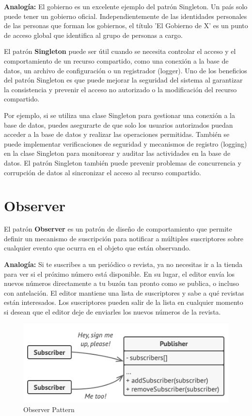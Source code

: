 \textbf{Analogía: }El gobierno es un excelente ejemplo del patrón Singleton. Un país solo puede tener un gobierno oficial. Independientemente de las identidades personales de las personas que forman los gobiernos, el título 'El Gobierno de X' es un punto de acceso global que identifica al grupo de personas a cargo.

El patrón \textbf{Singleton} puede ser útil cuando se necesita controlar el acceso y el comportamiento de un recurso compartido, como una conexión a la base de datos, un archivo de configuración o un registrador (logger). Uno de los beneficios del patrón Singleton es que puede mejorar la seguridad del sistema al garantizar la consistencia y prevenir el acceso no autorizado o la modificación del recurso compartido. 

Por ejemplo, si se utiliza una clase Singleton para gestionar una conexión a la base de datos, puedes asegurarte de que solo los usuarios autorizados puedan acceder a la base de datos y realizar las operaciones permitidas. También se puede implementar verificaciones de seguridad y mecanismos de registro (logging) en la clase Singleton para monitorear y auditar las actividades en la base de datos. El patrón Singleton también puede prevenir problemas de concurrencia y corrupción de datos al sincronizar el acceso al recurso compartido.


\section{Observer}

El patrón \textbf{Observer} es un patrón de diseño de comportamiento que permite definir un mecanismo de suscripción para notificar a múltiples suscriptores sobre cualquier evento que ocurra en el objeto que están observando. 

\textbf{Analogía: }Si te suscribes a un periódico o revista, ya no necesitas ir a la tienda para ver si el próximo número está disponible. En su lugar, el editor envía los nuevos números directamente a tu buzón tan pronto como se publica, o incluso con antelación. El editor mantiene una lista de suscriptores y sabe a qué revistas están interesados. Los suscriptores pueden salir de la lista en cualquier momento si desean que el editor deje de enviarles los nuevos números de la revista.

\begin{figure}[H]
    \centering
    \includegraphics[width=0.5\linewidth]{PatronesSoftware/observer.png}
    \caption{Observer Pattern}
    \label{fig:observer-pattern}
\end{figure}

